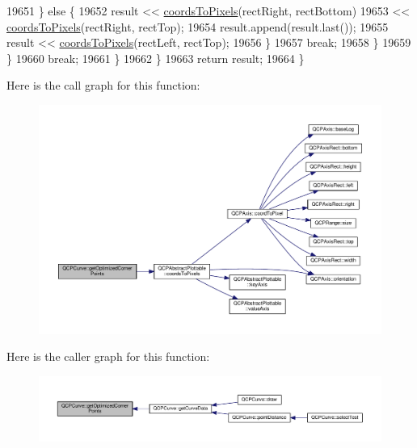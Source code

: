\begin{DoxyCode}
19651       \} \textcolor{keywordflow}{else} \{
19652         result << \hyperlink{class_q_c_p_abstract_plottable_ade710a776104b14c1c835168ce1bfc5c}{coordsToPixels}(rectRight, rectBottom)
19653                << \hyperlink{class_q_c_p_abstract_plottable_ade710a776104b14c1c835168ce1bfc5c}{coordsToPixels}(rectRight, rectTop);
19654         result.append(result.last());
19655         result << \hyperlink{class_q_c_p_abstract_plottable_ade710a776104b14c1c835168ce1bfc5c}{coordsToPixels}(rectLeft, rectTop);
19656       \}
19657       \textcolor{keywordflow}{break};
19658     \}
19659     \}
19660     \textcolor{keywordflow}{break};
19661   \}
19662   \}
19663   \textcolor{keywordflow}{return} result;
19664 \}
\end{DoxyCode}


Here is the call graph for this function\+:\nopagebreak
\begin{figure}[H]
\begin{center}
\leavevmode
\includegraphics[width=350pt]{class_q_c_p_curve_aad0b69d9a7a2a5367fcc9fe3edaf9bf4_cgraph}
\end{center}
\end{figure}




Here is the caller graph for this function\+:\nopagebreak
\begin{figure}[H]
\begin{center}
\leavevmode
\includegraphics[width=350pt]{class_q_c_p_curve_aad0b69d9a7a2a5367fcc9fe3edaf9bf4_icgraph}
\end{center}
\end{figure}


